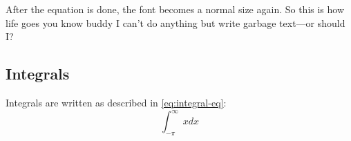 After the equation is done, the font becomes a normal size again. So this is how life
goes you know buddy I can't do anything but write garbage text---or should I?

\subsection{Integrals}

Integrals are written as described in \cref{eq:integral-eq}:
\begin{equation}
  \int_{-\pi}^{\infty}xdx
  \label{eq:integral-eq}
\end{equation}
